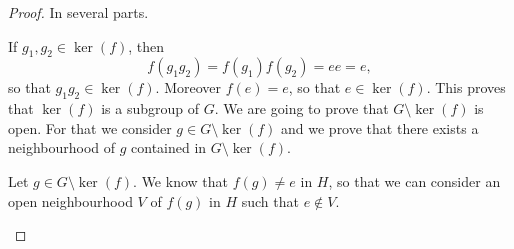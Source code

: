 \begin{proof}
	In several parts.
	\begin{subproof}
		If \( g_1,g_2\in \ker(f)\), then
		\begin{equation}
			f(g_1g_2)=f(g_1)f(g_2)=ee=e,
		\end{equation}
		so that \( g_1g_2\in\ker(f)\). Moreover \( f(e)=e\), so that \( e\in \ker(f)\). This proves that \( \ker(f)\) is a subgroup of \( G\).
		We are going to prove that \( G\setminus\ker(f)\) is open. For that we consider \( g\in G\setminus\ker(f)\) and we prove that there exists a neighbourhood of \( g\) contained in \( G\setminus\ker(f)\).

		Let \( g\in G\setminus\ker(f)\). We know that \( f(g)\neq e\) in \( H\), so that we can consider an open neighbourhood \( V\) of \( f(g)\) in \( H\) such that \( e\notin V\).


\end{subproof}
\end{proof}
